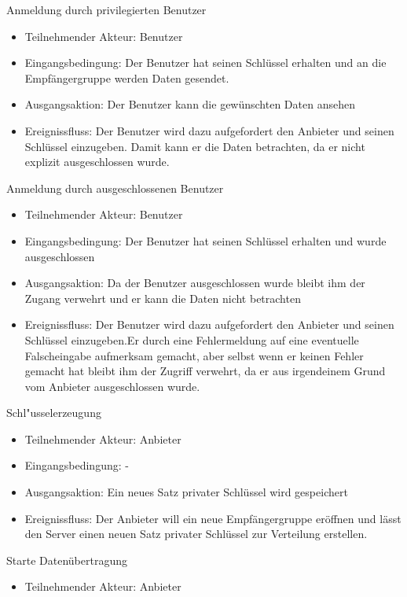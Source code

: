 \documentclass[a4paper,10pt]{scrartcl}
\begin{document}
\begin{usecase}
 {Anmeldung durch privilegierten Benutzer
   \begin{itemize}
   \item Teilnehmender Akteur: Benutzer
   \item Eingangsbedingung: Der Benutzer hat seinen Schlüssel erhalten und an die Empfängergruppe werden Daten gesendet.
   \item Ausgangsaktion: Der Benutzer kann die gewünschten Daten ansehen
   \item Ereignissfluss: Der Benutzer wird dazu aufgefordert den Anbieter und seinen Schlüssel
         einzugeben. Damit kann er die Daten betrachten, da er nicht explizit ausgeschlossen wurde.
   \end{itemize}
}
 {Anmeldung durch ausgeschlossenen Benutzer
   \begin{itemize}
   \item Teilnehmender Akteur: Benutzer
   \item Eingangsbedingung: Der Benutzer hat seinen Schlüssel erhalten und wurde ausgeschlossen
   \item Ausgangsaktion:  Da der Benutzer ausgeschlossen wurde bleibt ihm der Zugang verwehrt und er kann
             die Daten nicht betrachten
   \item Ereignissfluss: Der Benutzer wird dazu aufgefordert den Anbieter und seinen Schlüssel
         einzugeben.Er durch eine Fehlermeldung auf eine eventuelle Falscheingabe aufmerksam gemacht, aber selbst wenn er keinen
         Fehler gemacht hat bleibt ihm der Zugriff verwehrt, da er aus irgendeinem Grund vom Anbieter ausgeschlossen wurde.
   \end{itemize}
}
 {Schl"usselerzeugung
   \begin{itemize}
   \item Teilnehmender Akteur: Anbieter
   \item Eingangsbedingung: -
   \item Ausgangsaktion: Ein neues Satz privater Schlüssel wird gespeichert
   \item Ereignissfluss: Der Anbieter will ein neue Empfängergruppe eröffnen und lässt
         den Server einen neuen Satz privater Schlüssel zur Verteilung erstellen.
   \end{itemize}
}
 {Starte Datenübertragung
   \begin{itemize}
   \item Teilnehmender Akteur: Anbieter

\end{itemize}}
\end{usecase}
\end{document}
